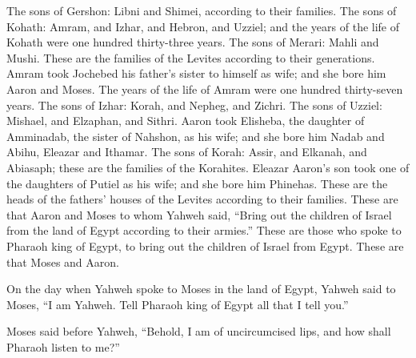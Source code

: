 {The sons of Gershon: Libni and Shimei, according to their families.
The sons of Kohath: Amram, and Izhar, and Hebron, and Uzziel; and the years of the life of Kohath were one hundred thirty-three years.
The sons of Merari: Mahli and Mushi. These are the families of the Levites according to their generations.
Amram took Jochebed his father’s sister to himself as wife; and she bore him Aaron and Moses. The years of the life of Amram were one hundred thirty-seven years.
The sons of Izhar: Korah, and Nepheg, and Zichri.
The sons of Uzziel: Mishael, and Elzaphan, and Sithri.
Aaron took Elisheba, the daughter of Amminadab, the sister of Nahshon, as his wife; and she bore him Nadab and Abihu, Eleazar and Ithamar.
The sons of Korah: Assir, and Elkanah, and Abiasaph; these are the families of the Korahites.
Eleazar Aaron’s son took one of the daughters of Putiel as his wife; and she bore him Phinehas. These are the heads of the fathers’ houses of the Levites according to their families.
These are that Aaron and Moses to whom Yahweh said, “Bring out the children of Israel from the land of Egypt according to their armies.”
These are those who spoke to Pharaoh king of Egypt, to bring out the children of Israel from Egypt. These are that Moses and Aaron.
\par }{\PP {}On the day when Yahweh spoke to Moses in the land of Egypt,
Yahweh said to Moses, “I am Yahweh. Tell Pharaoh king of Egypt all that I tell you.”
\par }{\PP {}Moses said before Yahweh, “Behold, I am of uncircumcised lips, and how shall Pharaoh listen to me?”

}
